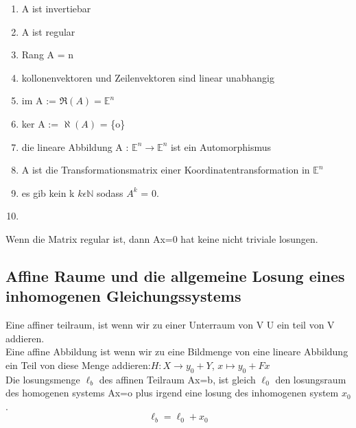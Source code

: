 \documentclass[11pt]{article}
\begin{document}
\begin{enumerate}
	\item A ist invertiebar
	\item A ist regular
	\item Rang A = n
	\item kollonenvektoren und Zeilenvektoren sind linear unabhangig
	\item im A := $\Re (A) = \mathbb{E}^n$
	\item ker A := $\aleph (A)$ = \{o\}
	\item die lineare Abbildung A : $\mathbb{E}^n \rightarrow \mathbb{E}^n$ ist ein Automorphismus
	\item A ist die Transformationsmatrix einer Koordinatentransformation in $\mathbb{E}^n$
	\item es gib kein k $k \epsilon \mathbb{N}$ sodass $A^k$ = 0.
	\item 
\end{enumerate}
Wenn die Matrix regular ist, dann Ax=0 hat keine nicht triviale losungen.
\subsection{Affine Raume und die allgemeine Losung eines inhomogenen Gleichungssystems}
Eine affiner teilraum, ist wenn wir zu einer Unterraum von V U ein teil von V addieren.\\
Eine affine Abbildung ist wenn wir zu eine Bildmenge von eine lineare Abbildung ein Teil von diese Menge addieren:$H : X \rightarrow y_0 + Y $,  $x \mapsto y_0 + Fx$\\
Die losungsmenge $\ell_b$ des affinen Teilraum Ax=b, ist gleich $\ell_0$ den losungsraum des homogenen systems Ax=o plus irgend eine losung des inhomogenen system $x_0$.
\begin{equation}
	\ell_b = \ell_0 + x_0
\end{equation}
\end{document}
